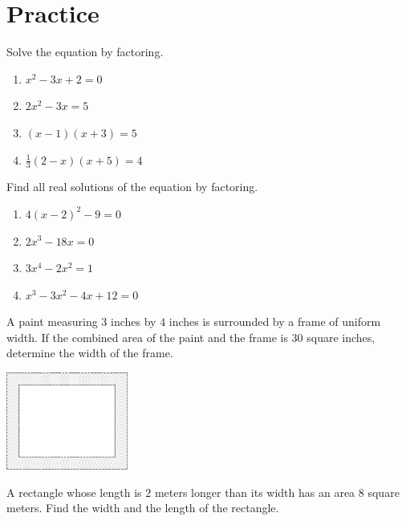 \documentclass[en,12pt]{elegantbook}
\providecommand{\tightlist}{%
  \setlength{\itemsep}{0pt}\setlength{\parskip}{0pt}}
\providecommand{\tightlist}{%
  \setlength{\itemsep}{0pt}\setlength{\parskip}{0pt}}
\let\BeginKnitrBlock\begin \let\EndKnitrBlock\end
\begin{document}
\hypertarget{practice-4}{%
\section{Practice}\label{practice-4}}

\BeginKnitrBlock{exercise}
\protect\hypertarget{exr:unnamed-chunk-117}{}{\label{exr:unnamed-chunk-117} }
Solve the equation by factoring.

\begin{enumerate}
\def\labelenumi{\arabic{enumi}.}
\tightlist
\item
  \(x^2-3x+2=0\)
\item
  \(2x^2-3x=5\)
\item
  \((x-1)(x+3)=5\)
\item
  \(\frac13(2-x)(x+5)=4\)
\end{enumerate}
\EndKnitrBlock{exercise}

\BeginKnitrBlock{exercise}
\protect\hypertarget{exr:unnamed-chunk-118}{}{\label{exr:unnamed-chunk-118} }
Find all real solutions of the equation by factoring.

\begin{enumerate}
\def\labelenumi{\arabic{enumi}.}
\tightlist
\item
  \(4(x-2)^2-9=0\)
\item
  \(2x^3-18x=0\)
\item
  \(3x^4-2x^2=1\)
\item
  \(x^3-3x^2-4x+12=0\)
\end{enumerate}
\EndKnitrBlock{exercise}

\BeginKnitrBlock{exercise}
\protect\hypertarget{exr:unnamed-chunk-119}{}{\label{exr:unnamed-chunk-119} }
A paint measuring \(3\) inches by \(4\) inches is surrounded by a frame of uniform width. If the combined area of the paint and the frame is \(30\) square inches, determine the width of the frame.

\includegraphics[width=0.3\textwidth,height=\textheight]{figs/tikz-paint-uniform-width.png}\\
\EndKnitrBlock{exercise}

\BeginKnitrBlock{exercise}
\protect\hypertarget{exr:unnamed-chunk-120}{}{\label{exr:unnamed-chunk-120} }
A rectangle whose length is \(2\) meters longer than its width has an area \(8\) square meters. Find the width and the length of the rectangle.
\EndKnitrBlock{exercise}
\end{document}
